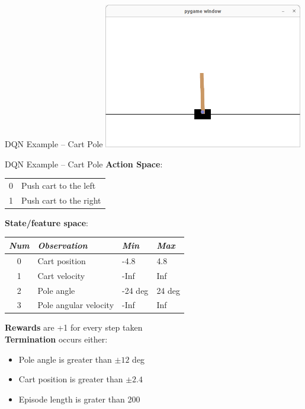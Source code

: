 \documentclass[ignorenonframetext,xcolor=x11names]{beamer}
\begin{document}
\begin{frame}{DQN Example -- Cart Pole}
\centering
\includegraphics[height=2.5in]{screen1.png}
\end{frame}

\begin{frame}{DQN Example -- Cart Pole}
\small
\textbf{Action Space}:
\begin{center}
\begin{tabular}{c|l} \hline
0 & Push cart to the left \\
1 & Push cart to the right \\ \hline
\end{tabular}
\end{center}


\textbf{State/feature space}:
\begin{center}
\begin{tabular}{c|l|l|l} \hline
\emph{Num} & \emph{Observation} & \emph{Min} & \emph{Max} \\ \hline
0 & Cart position & -4.8 & 4.8 \\
1 & Cart velocity & -Inf & Inf \\
2 & Pole angle & -24 deg & 24 deg \\
3 & Pole angular velocity & -Inf & Inf \\ \hline
\end{tabular}
\end{center}

\textbf{Rewards} are +1 for every step taken \\

\textbf{Termination} occurs either:
\begin{itemize}
\item Pole angle is greater than $\pm 12$ deg
\item Cart position is greater than $\pm 2.4$
\item Episode length is grater than 200
\end{itemize}
\end{frame}
\end{document}
